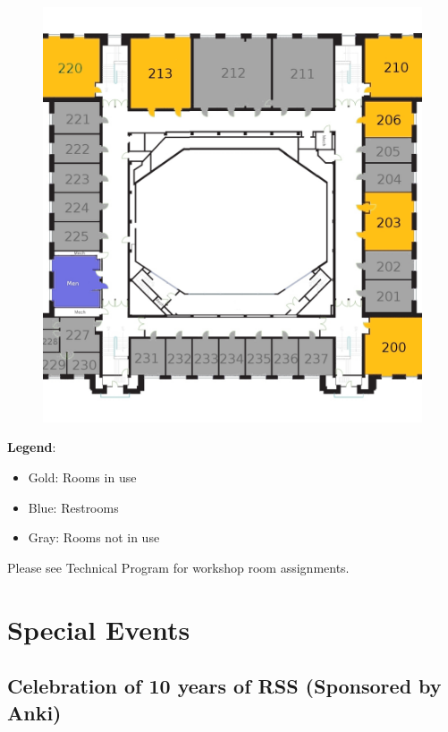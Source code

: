 \begin{figure}[h!]
\center
\includegraphics[height=0.6\textheight]{local_img/maps/second_floor_edited}
\end{figure}

\vspace{0.3cm}

{\Large \textbf{Legend}: 
\begin{itemize}
\itemsep0em 
\item Gold: Rooms in use 
\item Blue: Restrooms
\item Gray: Rooms not in use
\end{itemize}
}

\vspace{0.3cm}
{\Large Please see Technical Program for workshop room assignments.}


\newpage
{} \section{Special Events}
\vspace{0.2cm}

\subsection*{Celebration of 10 years of RSS (Sponsored by Anki)}

